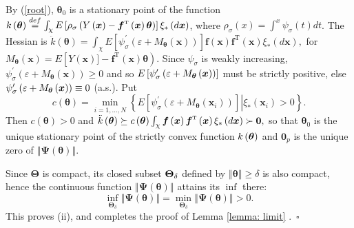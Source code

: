 \documentclass[10pt,a4paper]{amsart}
\def\T{{ \mathrm{\scriptscriptstyle T} }}
\theoremstyle{plain}
\theoremstyle{definition}
\theoremstyle{remark}
\begin{document}
By (\ref{root}), $\boldsymbol{\theta }_{0}$ is a stationary point of the
function $k\left( \boldsymbol{\theta }\right) \overset{def}{=}\int_{\mathcal{%
\chi }}E\left[ \rho _{\sigma }\left( Y\left( \boldsymbol{x}\right) -%
\boldsymbol{f}^{\T }\left( \boldsymbol{x}\right) \boldsymbol{\theta }%
\right) \right] \xi _{\ast }\left( d\boldsymbol{x}\right) $, where $\rho
_{\sigma }(x)=\int^{x}\psi _{\sigma }\left( t\right) dt$. The Hessian is $%
\ddot{k}\left( \boldsymbol{\theta }\right) =\int_{\mathcal{\chi }}E\left[
\psi _{\sigma }^{\prime }\left( \varepsilon +M_{\boldsymbol{\theta }}\left( 
\boldsymbol{x}\right) \right) \right] \boldsymbol{f}\left( \boldsymbol{x}%
\right) \boldsymbol{f}^{\T }\left( \boldsymbol{x}\right) \xi _{\ast
}\left( d\boldsymbol{x}\right) ,$ for $M_{\boldsymbol{\theta }}\left( 
\boldsymbol{x}\right) =E\left[  Y\left( \boldsymbol{x}%
\right)] -\boldsymbol{f} ^{\T }\left( \boldsymbol{x}\right) \boldsymbol{\theta }\right) $. Since $\psi_{\sigma }$ is weakly increasing, $\psi _{\sigma }^{\prime }\left(
\varepsilon +M_{\boldsymbol{\theta }}\left( \boldsymbol{x}\right) \right)
\geq 0$ and so $E\left[ \psi _{\sigma }^{\prime }\left( \varepsilon +M_{%
\boldsymbol{\theta }}\left( \boldsymbol{x}\right) \right) \right] $ must be
strictly positive, else $\psi _{\sigma }^{\prime }\left( \varepsilon +M_{%
\boldsymbol{\theta }}\left( \boldsymbol{x}\right) \right) \equiv 0$ (a.s.).
Put 
\begin{equation*}
c\left( \boldsymbol{\theta }\right) =\min_{i=1,...,N}\left\{ E\left[ \psi
_{\sigma }^{\prime }\left( \varepsilon +M_{\boldsymbol{\theta }}\left( 
\boldsymbol{x}_{i}\right) \right) \right] \left\vert {}\right. \xi _{\ast
}\left( \boldsymbol{x}_{i}\right) >0\right\} .
\end{equation*}%
Then $c\left( \boldsymbol{\theta }\right) >0$ and $\ddot{k}\left( 
\boldsymbol{\theta }\right) \succeq c\left( \boldsymbol{\theta }\right)
\int_{\mathcal{\chi }}\boldsymbol{f}\left( \boldsymbol{x}\right) \boldsymbol{%
f}^{\T }\left( \boldsymbol{x}\right) \xi _{\ast }\left( d\boldsymbol{x}%
\right) \succ \boldsymbol{0},$ so that $\boldsymbol{\theta }_{0}$ is the
unique stationary point of the strictly convex function $k\left( \boldsymbol{%
\theta }\right) $ and $\boldsymbol{0}_p$ is the unique zero of $\left\Vert 
\boldsymbol{\Psi }\left( \boldsymbol{\theta }\right) \right\Vert $.

Since $\boldsymbol{\Theta }$ is compact, its closed subset $\boldsymbol{%
\Theta }_{\delta }$ defined by $\left\Vert \boldsymbol{\theta }\right\Vert
\geq \delta $ is also compact, hence the continuous function $\left\Vert 
\boldsymbol{\Psi }\left( \boldsymbol{\theta }\right) \right\Vert $ attains
its $\inf $ there:%
\begin{equation*}
\inf_{\boldsymbol{\Theta }_{\delta }}\left\Vert \boldsymbol{\Psi }\left( 
\boldsymbol{\theta }\right) \right\Vert =\min_{\boldsymbol{\Theta }_{\delta
}}\left\Vert \boldsymbol{\Psi }\left( \boldsymbol{\theta }\right)
\right\Vert >0.
\end{equation*}%
This proves (ii), and completes the proof of Lemma \ref{lemma: limit}%
.\hfill\ $\square $

\medskip
\end{document}

